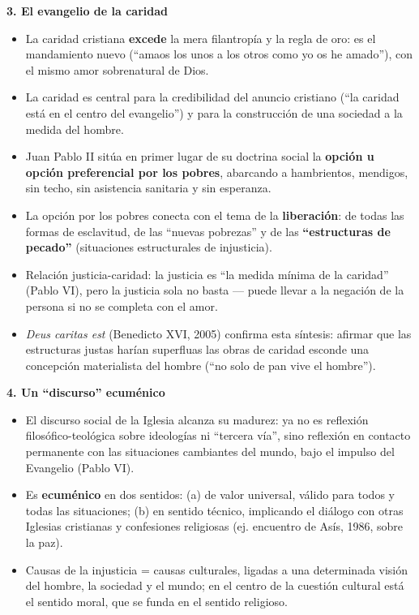 \documentclass[10pt,a4paper]{article}
\begin{document}
\medskip\noindent \textbf{3. El evangelio de la caridad}\par\nopagebreak
\begin{itemize}
\item La caridad cristiana \textbf{excede} la mera filantropía y la regla de oro: es el mandamiento nuevo (``amaos los unos a los otros como yo os he amado''), con el mismo amor sobrenatural de Dios.
\item La caridad es central para la credibilidad del anuncio cristiano (``la caridad está en el centro del evangelio'') y para la construcción de una sociedad a la medida del hombre.
\item Juan Pablo II sitúa en primer lugar de su doctrina social la \textbf{opción u opción preferencial por los pobres}, abarcando a hambrientos, mendigos, sin techo, sin asistencia sanitaria y sin esperanza.
\item La opción por los pobres conecta con el tema de la \textbf{liberación}: de todas las formas de esclavitud, de las ``nuevas pobrezas'' y de las \textbf{``estructuras de pecado''} (situaciones estructurales de injusticia).
\item Relación justicia-caridad: la justicia es ``la medida mínima de la caridad'' (Pablo VI), pero la justicia sola no basta --- puede llevar a la negación de la persona si no se completa con el amor.
\item \textit{Deus caritas est} (Benedicto XVI, 2005) confirma esta síntesis: afirmar que las estructuras justas harían superfluas las obras de caridad esconde una concepción materialista del hombre (``no solo de pan vive el hombre'').
\end{itemize}

\medskip\noindent \textbf{4. Un ``discurso'' ecuménico}\par\nopagebreak
\begin{itemize}
\item El discurso social de la Iglesia alcanza su madurez: ya no es reflexión filosófico-teológica sobre ideologías ni ``tercera vía'', sino reflexión en contacto permanente con las situaciones cambiantes del mundo, bajo el impulso del Evangelio (Pablo VI).
\item Es \textbf{ecuménico} en dos sentidos: (a) de valor universal, válido para todos y todas las situaciones; (b) en sentido técnico, implicando el diálogo con otras Iglesias cristianas y confesiones religiosas (ej. encuentro de Asís, 1986, sobre la paz).
\item Causas de la injusticia = causas culturales, ligadas a una determinada visión del hombre, la sociedad y el mundo; en el centro de la cuestión cultural está el sentido moral, que se funda en el sentido religioso.
\end{itemize}
\end{document}
